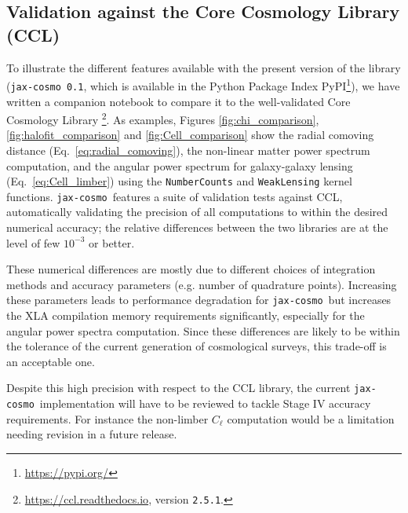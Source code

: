\documentclass[twocolumn,twocolappendix,nofootinbib,iop]{openjournal}
\newcommand{\nblink}[1]{\href{https://github.com/DifferentiableUniverseInitiative/jax-cosmo-paper/blob/master/notebooks/#1.ipynb}{\faFileCodeO}}
\newcommand{\resubnote}[1]{#1} %
\newcommand{\jaxcosmo}{\texttt{jax-cosmo}}
\begin{document}
\subsection{Validation against the Core Cosmology Library (CCL)}
%
To illustrate the different features available with the present version of the library (\jaxcosmo\ \texttt{0.1}, which is available in the Python Package Index PyPI\footnote{\url{https://pypi.org/}}), we have written a  companion notebook \nblink{CCL_comparison} to compare it to the well-validated  Core Cosmology Library \citep{2019ApJS..242....2C}\footnote{\url{https://ccl.readthedocs.io}, version \texttt{2.5.1}.}. As examples, Figures \ref{fig:chi_comparison},
\ref{fig:halofit_comparison} and \ref{fig:Cell_comparison}
show the radial comoving distance (Eq.~\ref{eq:radial_comoving}), the non-linear matter power spectrum computation, and the angular power spectrum for galaxy-galaxy lensing (Eq.~\ref{eq:Cell_limber}) using the \texttt{NumberCounts} and \texttt{WeakLensing} kernel functions. \jaxcosmo\ features a suite of validation tests against CCL, automatically validating the precision of all computations to within the desired numerical accuracy; the relative differences between the two libraries are at the level of few $10^{-3}$ or better.

These numerical differences are mostly due to different choices of integration methods and accuracy parameters (e.g. number of quadrature points). Increasing these parameters leads to performance degradation for \jaxcosmo\, but increases the XLA compilation memory requirements significantly, especially for the angular power spectra computation. Since these differences are likely to be within the tolerance of the current generation of cosmological surveys, this trade-off is an acceptable one.

\resubnote{Despite this high precision with respect to the CCL library, the current \jaxcosmo\ implementation will have to be reviewed to tackle Stage IV accuracy requirements. For instance the non-limber $C_\ell$  computation \citep{n5k, angpow} would be a limitation needing revision in a future release.} 
\end{document}
